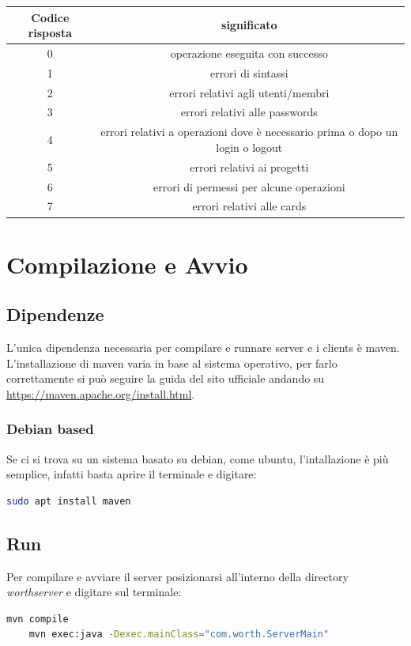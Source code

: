 \documentclass[11pt]{report}
\begin{document}
	\begin{center}
		\begin{tabular}{ |c|c| } 
			\hline
			Codice risposta & significato \\
			\hline\hline
			0	& operazione eseguita con successo \\
			\hline
			1	& errori di sintassi \\
			\hline
			2	& errori relativi agli utenti/membri \\
			\hline
			3	& errori relativi alle passwords \\
			\hline
			4	& errori relativi a operazioni dove è necessario prima o dopo un login o logout \\
			\hline
			5	& errori relativi ai progetti \\
			\hline
			6	& errori di permessi per alcune operazioni \\
			\hline
			7	& errori relativi alle cards \\
			\hline
		\end{tabular}
	\end{center}

	\chapter{Compilazione e Avvio}
	
	\section{Dipendenze}
	L'unica dipendenza necessaria per compilare e runnare server e i clients è maven.\\
	L'installazione di maven varia in base al sistema operativo, per farlo correttamente si può seguire la guida del sito ufficiale andando su  \href{https://maven.apache.org/install.html}{https://maven.apache.org/install.html}.
	
	\subsection{Debian based}
	Se ci si trova su un sistema basato su debian, come ubuntu, l'intallazione è più semplice, infatti basta aprire il terminale e digitare:
	\begin{lstlisting}[language=bash]
	sudo apt install maven
	\end{lstlisting}

	
	\section{Run}
	Per compilare e avviare il server posizionarsi all'interno della directory \textit{worthserver} e digitare sul terminale:
	\begin{lstlisting}[language=bash]
	mvn compile
	mvn exec:java -Dexec.mainClass="com.worth.ServerMain"
	\end{lstlisting}
	
\end{document}
